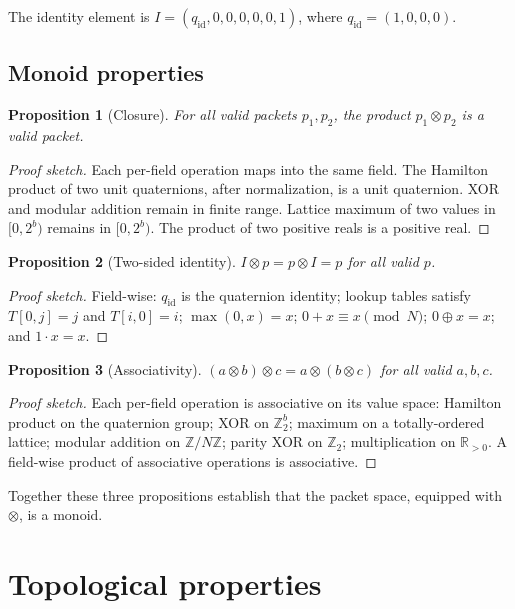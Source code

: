 \documentclass[11pt]{article}
\newtheorem{proposition}{Proposition}
\begin{document}
The identity element is $I = (q_{\mathrm{id}}, 0, 0, 0, 0, 0, 1)$, where
$q_{\mathrm{id}} = (1,0,0,0)$.

\subsection{Monoid properties}

\begin{proposition}[Closure]
For all valid packets $p_1, p_2$, the product $p_1 \otimes p_2$ is a valid
packet.
\end{proposition}

\begin{proof}[Proof sketch]
Each per-field operation maps into the same field. The Hamilton product of two
unit quaternions, after normalization, is a unit quaternion. XOR and modular
addition remain in finite range. Lattice maximum of two values in
$[0, 2^b)$ remains in $[0,2^b)$. The product of two positive reals is a positive
real.
\end{proof}

\begin{proposition}[Two-sided identity]
$I \otimes p = p \otimes I = p$ for all valid $p$.
\end{proposition}

\begin{proof}[Proof sketch]
Field-wise: $q_{\mathrm{id}}$ is the quaternion identity; lookup tables
satisfy $T[0,j]=j$ and $T[i,0]=i$; $\max(0,x)=x$; $0+x \equiv x \pmod{N}$;
$0 \oplus x = x$; and $1 \cdot x = x$.
\end{proof}

\begin{proposition}[Associativity]
$(a \otimes b) \otimes c = a \otimes (b \otimes c)$ for all valid $a,b,c$.
\end{proposition}

\begin{proof}[Proof sketch]
Each per-field operation is associative on its value space: Hamilton product on
the quaternion group; XOR on $\mathbb{Z}_2^b$; maximum on a totally-ordered
lattice; modular addition on $\mathbb{Z}/N\mathbb{Z}$; parity XOR on
$\mathbb{Z}_2$; multiplication on $\mathbb{R}_{>0}$. A field-wise product of
associative operations is associative.
\end{proof}

Together these three propositions establish that the packet space, equipped
with $\otimes$, is a monoid.

\section{Topological properties}
\end{document}
